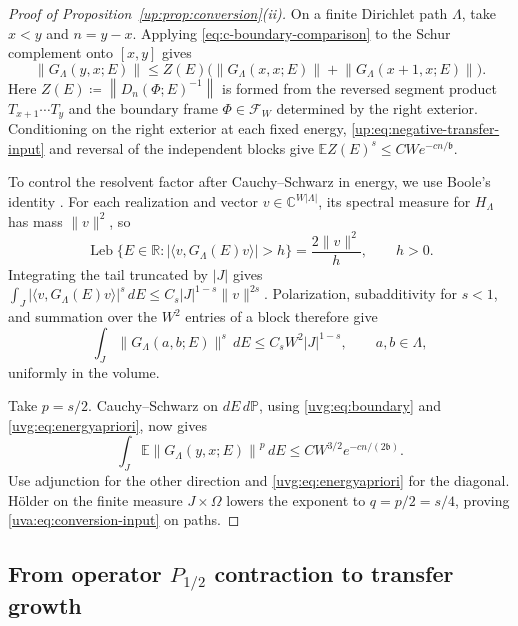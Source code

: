 \documentclass[11pt]{article}
\numberwithin{equation}{section}
\theoremstyle{remark}
\newcommand{\E}{\mathbb E}
\newcommand{\Prob}{\mathbb P}
\newcommand{\C}{\mathbb C}
\newcommand{\R}{\mathbb R}
\newcommand{\norm}[1]{\left\|#1\right\|}
\begin{document}
\begin{proof}[Proof of Proposition~\ref{up:prop:conversion}\textup{(ii)}]
On a finite Dirichlet path $\Lambda$, take $x<y$ and $n=y-x$.
Applying \eqref{eq:c-boundary-comparison} to the Schur complement
onto $[x,y]$ gives
\begin{equation}\label{uvg:eq:boundary}
 \norm{G_\Lambda(y,x;E)}
 \le Z(E)\bigl(\norm{G_\Lambda(x,x;E)}
                    +\norm{G_\Lambda(x+1,x;E)}\bigr).
\end{equation}
Here $Z(E)\coloneqq\norm{D_n(\Phi;E)^{-1}}$ is formed from the reversed
segment product $T_{x+1}\cdots T_y$ and the boundary frame
$\Phi\in\mathcal F_W$ determined by the right exterior.
Conditioning on the right exterior at each fixed energy,
\eqref{up:eq:negative-transfer-input} and reversal of the independent
blocks give \(\E Z(E)^s\le CW e^{-cn/\mathfrak b}\).

To control the resolvent factor after Cauchy--Schwarz in energy,
we use Boole's identity \cite[(1.5)]{PSZ}. For each realization and
vector $v\in\C^{W|\Lambda|}$, its spectral measure for $H_\Lambda$
has mass $\|v\|^2$, so
\[
 \operatorname{Leb}\{E\in\R:|\langle v,G_\Lambda(E)v\rangle|>h\}
 =\frac{2\|v\|^2}{h},\qquad h>0.
\]
Integrating the tail truncated by $|J|$ gives
$\int_J|\langle v,G_\Lambda(E)v\rangle|^s\,dE
\le C_s|J|^{1-s}\|v\|^{2s}$.
Polarization, subadditivity for $s<1$, and summation over the $W^2$
entries of a block therefore give
\begin{equation}\label{uvg:eq:energyapriori}
 \int_J\|G_\Lambda(a,b;E)\|^s\,dE
 \le C_sW^2|J|^{1-s},\qquad a,b\in\Lambda,
\end{equation}
uniformly in the volume.

Take \(p=s/2\). Cauchy--Schwarz on \(dE\,d\Prob\), using
\eqref{uvg:eq:boundary} and \eqref{uvg:eq:energyapriori}, now gives
\[
 \int_J\E\norm{G_\Lambda(y,x;E)}^p\,dE
 \le CW^{3/2}e^{-cn/(2\mathfrak b)}.
\]
Use adjunction for the other direction and \eqref{uvg:eq:energyapriori}
for the diagonal.
H\"older on the finite measure \(J\times\Omega\) lowers the exponent to
\(q=p/2=s/4\), proving \eqref{uva:eq:conversion-input} on paths.
\end{proof}


\subsection{From operator \texorpdfstring{$P_{1/2}$}{P(1/2)} contraction to transfer growth}
\label{sec:upper-inputs}
\end{document}
